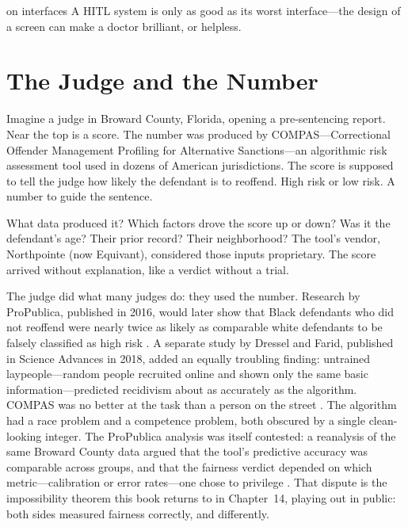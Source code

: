 
\label{chap:ch06}
\begin{chapterquote}{on interfaces}
A HITL system is only as good as its worst interface---the design of a screen can make a doctor brilliant, or helpless.
\end{chapterquote}

\section{The Judge and the Number}
\label{sec:ch6-judge-number}

Imagine a judge in Broward County, Florida, opening a pre-sentencing report. Near the top is a score. The number was produced by COMPAS---Correctional Offender Management Profiling for Alternative Sanctions---an algorithmic risk assessment tool used in dozens of American jurisdictions. The score is supposed to tell the judge how likely the defendant is to reoffend. High risk or low risk. A number to guide the sentence.

What data produced it? Which factors drove the score up or down? Was it the defendant's age? Their prior record? Their neighborhood? The tool's vendor, Northpointe (now Equivant), considered those inputs proprietary. The score arrived without explanation, like a verdict without a trial.

The judge did what many judges do: they used the number. Research by ProPublica, published in 2016, would later show that Black defendants who did not reoffend were nearly twice as likely as comparable white defendants to be falsely classified as high risk \autocite{angwin2016machine}. A separate study by Dressel and Farid, published in Science Advances in 2018, added an equally troubling finding: untrained laypeople---random people recruited online and shown only the same basic information---predicted recidivism about as accurately as the algorithm. COMPAS was no better at the task than a person on the street \autocite{dressel2018accuracy}. The algorithm had a race problem and a competence problem, both obscured by a single clean-looking integer. The ProPublica analysis was itself contested: a reanalysis of the same Broward County data argued that the tool's predictive accuracy was comparable across groups, and that the fairness verdict depended on which metric---calibration or error rates---one chose to privilege \autocite{flores2016false}. That dispute is the impossibility theorem this book returns to in Chapter~14, playing out in public: both sides measured fairness correctly, and differently.

